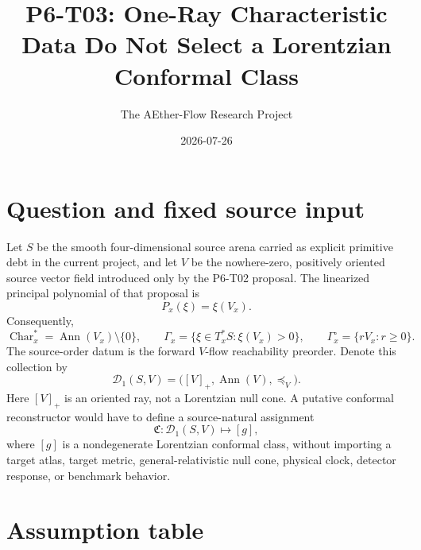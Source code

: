 \documentclass[11pt]{article}
\title{P6-T03: One-Ray Characteristic Data Do Not Select a Lorentzian Conformal Class}
\author{The AEther-Flow Research Project}
\date{2026-07-26}
\newcommand{\Ann}{\operatorname{Ann}}
\newcommand{\Char}{\operatorname{Char}}
\begin{document}
\maketitle

\begin{center}
\end{center}

\section{Question and fixed source input}

Let \(S\) be the smooth four-dimensional source arena carried as explicit
primitive debt in the current project, and let \(V\) be the nowhere-zero,
positively oriented source vector field introduced only by the P6-T02
proposal.  The linearized principal polynomial of that proposal is
\[
   P_x(\xi)=\xi(V_x).
\]
Consequently,
\[
   \Char_x^*=\Ann(V_x)\setminus\{0\},\qquad
   \Gamma_x=\{\xi\in T_x^*S:\xi(V_x)>0\},\qquad
   \Gamma_x^\circ=\{rV_x:r\geq 0\}.
\]
The source-order datum is the forward \(V\)-flow reachability preorder.
Denote this collection by
\[
   \mathcal D_1(S,V)
   =\bigl([V]_+,\Ann(V),\preceq_V\bigr).
\]
Here \([V]_+\) is an oriented ray, not a Lorentzian null cone.  A putative
conformal reconstructor would have to define a source-natural assignment
\[
   \mathfrak C:\mathcal D_1(S,V)\longmapsto[g],
\]
where \([g]\) is a nondegenerate Lorentzian conformal class, without importing
a target atlas, target metric, general-relativistic null cone, physical clock,
detector response, or benchmark behavior.

\section{Assumption table}
\end{document}
